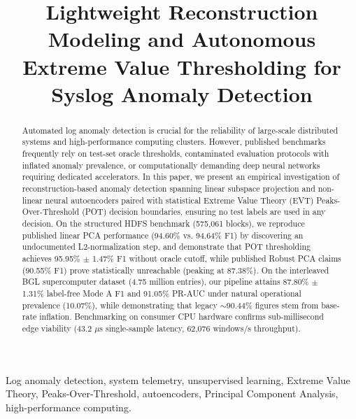 \documentclass[conference]{IEEEtran}
\begin{document}
\title{Lightweight Reconstruction Modeling and Autonomous Extreme Value Thresholding for Syslog Anomaly Detection}

\author{
}

\maketitle

\begin{abstract}
Automated log anomaly detection is crucial for the reliability of large-scale distributed systems and high-performance computing clusters. However, published benchmarks frequently rely on test-set oracle thresholds, contaminated evaluation protocols with inflated anomaly prevalence, or computationally demanding deep neural networks requiring dedicated accelerators. In this paper, we present an empirical investigation of reconstruction-based anomaly detection spanning linear subspace projection and non-linear neural autoencoders paired with statistical Extreme Value Theory (EVT) Peaks-Over-Threshold (POT) decision boundaries, ensuring no test labels are used in any decision. On the structured HDFS benchmark (575,061 blocks), we reproduce published linear PCA performance (94.60\% vs. 94.64\% F1) by discovering an undocumented L2-normalization step, and demonstrate that POT thresholding achieves 95.95\% $\pm$ 1.47\% F1 without oracle cutoff, while published Robust PCA claims (90.55\% F1) prove statistically unreachable (peaking at 87.38\%). On the interleaved BGL supercomputer dataset (4.75 million entries), our pipeline attains 87.80\% $\pm$ 1.31\% label-free Mode A F1 and 91.05\% PR-AUC under natural operational prevalence (10.07\%), while demonstrating that legacy $\sim$90.44\% figures stem from base-rate inflation. Benchmarking on consumer CPU hardware confirms sub-millisecond edge viability (43.2 $\mu$s single-sample latency, 62,076 windows/s throughput).
\end{abstract}

\begin{IEEEkeywords}
Log anomaly detection, system telemetry, unsupervised learning, Extreme Value Theory, Peaks-Over-Threshold, autoencoders, Principal Component Analysis, high-performance computing.
\end{IEEEkeywords}
\end{document}
